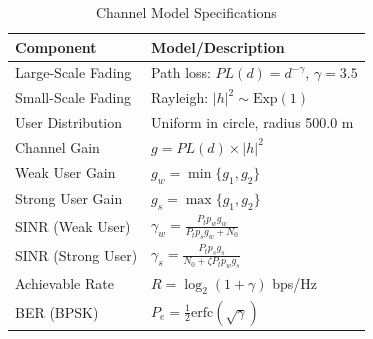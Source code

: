 \documentclass{article}
\begin{document}
\begin{table}[h]
\centering
\caption{Channel Model Specifications}
\label{tab:channel_model}
\begin{tabular}{|l|l|}
\hline
\textbf{Component} & \textbf{Model/Description} \\
\hline
Large-Scale Fading & Path loss: $PL(d) = d^{-\gamma}$, $\gamma = 3.5$ \\
Small-Scale Fading & Rayleigh: $|h|^2 \sim \text{Exp}(1)$ \\
User Distribution & Uniform in circle, radius 500.0 m \\
Channel Gain & $g = PL(d) \times |h|^2$ \\
\hline
Weak User Gain & $g_w = \min\{g_1, g_2\}$ \\
Strong User Gain & $g_s = \max\{g_1, g_2\}$ \\
\hline
SINR (Weak User) & $\gamma_w = \frac{P_t p_w g_w}{P_t p_s g_w + N_0}$ \\
SINR (Strong User) & $\gamma_s = \frac{P_t p_s g_s}{N_0 + \zeta P_t p_w g_s}$ \\
\hline
Achievable Rate & $R = \log_2(1 + \gamma)$ bps/Hz \\
BER (BPSK) & $P_e = \frac{1}{2}\text{erfc}(\sqrt{\gamma})$ \\
\hline
\end{tabular}
\end{table}


\newpage
\end{document}
